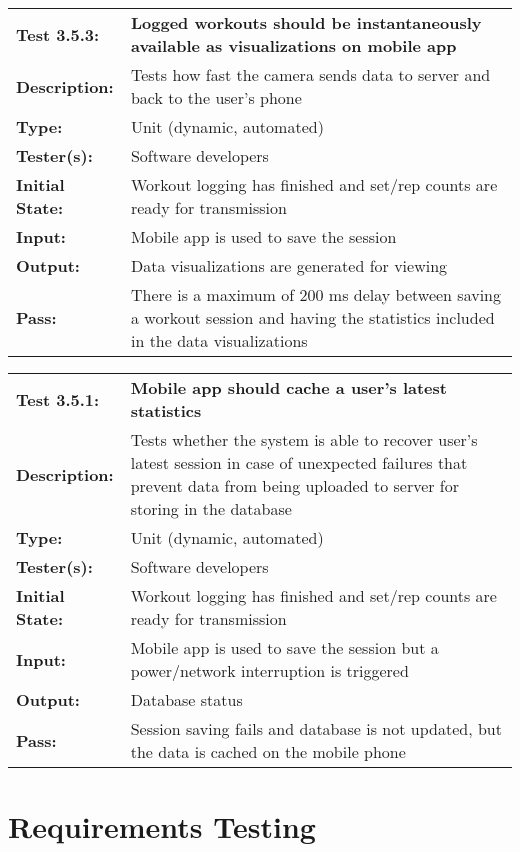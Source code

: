 \documentclass{article}
\newenvironment{testcase}
    {
    \begin{center}
    \begin{mdframed}[
        userdefinedwidth=15.5cm,
        leftmargin=1cm,
        rightmargin=1cm
        ]
    \begin{tabular}{p{2.5cm} p{9cm}}
    }
    {
    \end{tabular}
    \end{mdframed}
    \end{center}
    }
\newcommand{\tctit}[2]{\textbf{#1} & \textbf{#2}}
\newcommand{\tcdesc}{\textbf{Description:}}
\newcommand{\tctype}{\textbf{Type:}}
\newcommand{\testers}{\textbf{Tester(s):}}
\newcommand{\tcinit}{\textbf{Initial State:}}
\newcommand{\tcin}{\textbf{Input:}}
\newcommand{\tcout}{\textbf{Output:}}
\newcommand{\tcpass}{\textbf{Pass:}}
\begin{document}
\begingroup
\begin{testcase}
\tctit{Test 3.5.3:}{Logged workouts should be instantaneously available as visualizations on mobile app} \\
\tcdesc & Tests how fast the camera sends data to server and back to the user's phone \\
\tctype & Unit (dynamic, automated) \\
\testers & Software developers \\
\tcinit & Workout logging has finished and set/rep counts are ready for transmission \\
\tcin & Mobile app is used to save the session \\
\tcout & Data visualizations are generated for viewing\\
\tcpass & There is a maximum of 200 ms delay between saving a workout session and having the statistics included in the data visualizations\\
\end{testcase}
\endgroup

\begingroup
\begin{testcase}
\tctit{Test 3.5.1:}{Mobile app should cache a user’s latest statistics} \\
\tcdesc & Tests whether the system is able to recover user's latest session in case of unexpected failures that prevent data from being uploaded to server for storing in the database \\
\tctype & Unit (dynamic, automated) \\
\testers & Software developers \\
\tcinit & Workout logging has finished and set/rep counts are ready for transmission \\
\tcin & Mobile app is used to save the session but a power/network interruption is triggered \\
\tcout & Database status\\
\tcpass & Session saving fails and database is not updated, but the data is cached on the mobile phone \\
\end{testcase}
\endgroup

\newpage
\section{Requirements Testing}
\end{document}
